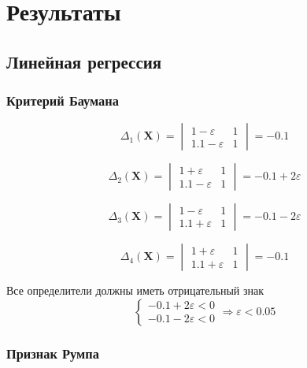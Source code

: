 \section{Результаты}
\subsection{Линейная регрессия}
\subsubsection{Критерий Баумана}
\begin{equation}
\Delta_1(\textbf{X})=
\begin{vmatrix}
1-\varepsilon & 1 \\
1.1-\varepsilon & 1 
\end{vmatrix}
=-0.1
\end{equation}

\begin{equation}
\Delta_2(\textbf{X})=
\begin{vmatrix}
1+\varepsilon & 1 \\
1.1-\varepsilon & 1 
\end{vmatrix}
=-0.1+2\varepsilon
\end{equation}

\begin{equation}
\Delta_3(\textbf{X})=
\begin{vmatrix}
1-\varepsilon & 1 \\
1.1+\varepsilon & 1 
\end{vmatrix}
=-0.1-2\varepsilon
\end{equation}

\begin{equation}
\Delta_4(\textbf{X})=
\begin{vmatrix}
1+\varepsilon & 1 \\
1.1+\varepsilon & 1 
\end{vmatrix}
=-0.1
\end{equation}

Все определители должны иметь отрицательный знак
\begin{equation*}
 \begin{cases}
   -0.1+2\varepsilon < 0\\
   -0.1-2\varepsilon < 0
 \end{cases}
 \Rightarrow 
 \varepsilon<0.05
\end{equation*}

\subsubsection{Признак Румпа}


